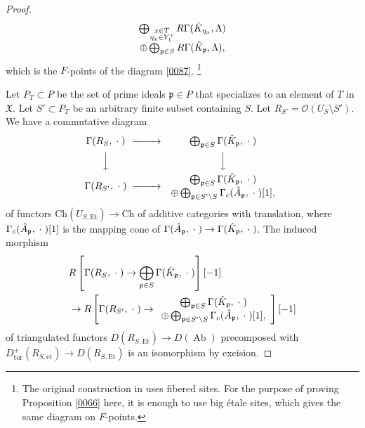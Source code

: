 \documentclass{amsart}
\theoremstyle{remark}
\numberwithin{equation}{section}
\newcommand{\Order}{\mathcal{O}}
\newcommand{\et}{\mathrm{et}}
\newcommand{\Et}{\mathrm{Et}}
\newcommand{\tor}{\mathrm{tor}}
\newcommand{\var}{\;\cdot\;}
\newcommand{\Ch}{\mathrm{Ch}}
\newcommand{\ideal}[1]{\mathfrak{#1}}
\DeclareMathOperator{\Ab}{Ab}
\begin{document}
\begin{proof}
\[\begin{CD}
\begin{array}{c}
							\bigoplus_{
								\substack{
									x \in T \\
									\eta_{x} \in Y_{1}^{x}
								}
							}
								R \Gamma(\Hat{K}_{\eta_{x}}, \Lambda)
						\\
						\oplus
							\bigoplus_{\ideal{p} \in S}
								R \Gamma(\Hat{K}_{\ideal{p}}, \Lambda),
					\end{array}
			\end{CD}
		\]
	which is the $F$-points of the diagram \eqref{0087}.%
	\footnote{
		The original construction in \cite[Section 4.6]{Suz24} uses fibered sites.
		For the purpose of proving Proposition \ref{0066} here,
		it is enough to use big \'etale sites,
		which gives the same diagram on $F$-points.
	}
	
	Let $P_{T} \subset P$ be the set of prime ideals $\ideal{p} \in P$
	that specializes to an element of $T$ in $\mathfrak{X}$.
	Let $S' \subset P_{T}$ be an arbitrary finite subset containing $S$.
	Let $R_{S'} = \Order(U_{S} \setminus S')$.
	We have a commutative diagram
		\begin{equation} \label{0102}
			\begin{CD}
					\Gamma(R_{S}, \var)
				@>>>
					\bigoplus_{\ideal{p} \in S}
						\Gamma(\Hat{K}_{\ideal{p}}, \var)
				\\ @VVV @VVV \\
					\Gamma(R_{S'}, \var)
				@>>>
					\begin{array}{c}
							\bigoplus_{\ideal{p} \in S}
								\Gamma(\Hat{K}_{\ideal{p}}, \var)
						\\
						\oplus
							\bigoplus_{\ideal{p} \in S' \setminus S}
								\Gamma_{c}(\Hat{A}_{\ideal{p}}, \var)[1],
					\end{array}
			\end{CD}
		\end{equation}
	of functors $\Ch(U_{S, \Et}) \to \Ch$ of additive categories with translation,
	where $\Gamma_{c}(\Hat{A}_{\ideal{p}}, \var)[1]$ is the mapping cone of
	$\Gamma(\Hat{A}_{\ideal{p}}, \var) \to \Gamma(\Hat{K}_{\ideal{p}}, \var)$.
	The induced morphism
		\begin{align*}
			&
					R \left[
							\Gamma(R_{S}, \var)
						\to
							\bigoplus_{\ideal{p} \in S}
								\Gamma(\Hat{K}_{\ideal{p}}, \var)
					\right][-1]
			\\
			&	\to
					R \left[
							\Gamma(R_{S'}, \var)
						\to
							\begin{array}{c}
									\bigoplus_{\ideal{p} \in S}
										\Gamma(\Hat{K}_{\ideal{p}}, \var)
								\\
								\oplus
									\bigoplus_{\ideal{p} \in S' \setminus S}
										\Gamma_{c}(\Hat{A}_{\ideal{p}}, \var)[1],
							\end{array}
					\right][-1]
		\end{align*}
	of triangulated functors $D(R_{S, \Et}) \to D(\Ab)$
	precomposed with $D_{\tor}^{+}(R_{S, \et}) \to D(R_{S, \Et})$
	is an isomorphism by excision.
	

\end{proof}
\end{document}
